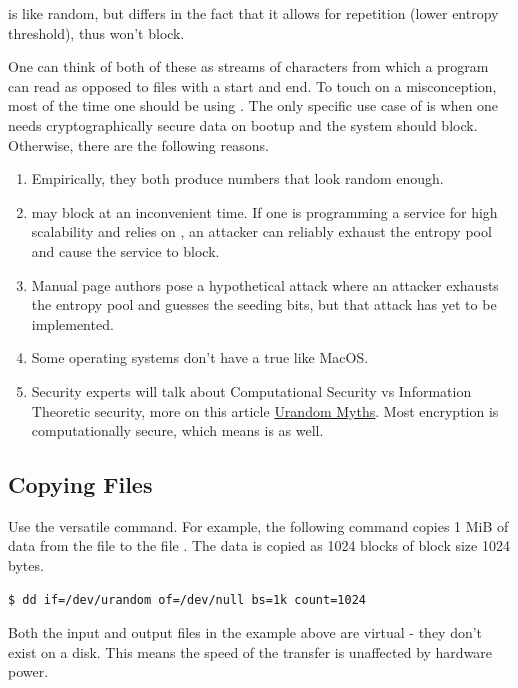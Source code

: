  is like random, but differs in the fact that it allows for repetition (lower entropy threshold), thus won't block.

One can think of both of these as streams of characters from which a program can read as opposed to files with a start and end.
To touch on a misconception, most of the time one should be using .
The only specific use case of  is when one needs cryptographically secure data on bootup and the system should block.
Otherwise, there are the following reasons.

\begin{enumerate}
\item Empirically, they both produce numbers that look random enough.
\item {} may block at an inconvenient time. If one is programming a service for high scalability and relies on , an attacker can reliably exhaust the entropy pool and cause the service to block.
\item Manual page authors pose a hypothetical attack where an attacker exhausts the entropy pool and guesses the seeding bits, but that attack has yet to be implemented.
\item Some operating systems don't have a true  like MacOS.
\item Security experts will talk about Computational Security vs Information Theoretic security, more on this article \href{https://www.2uo.de/myths-about-urandom}{Urandom Myths}. Most encryption is computationally secure, which means  is as well.
\end{enumerate}

\subsection{Copying Files}

Use the versatile  command.
For example, the following command copies 1 MiB of data from the file  to the file .
The data is copied as 1024 blocks of block size 1024 bytes.

\begin{lstlisting}[language=bash]
$ dd if=/dev/urandom of=/dev/null bs=1k count=1024
\end{lstlisting}

Both the input and output files in the example above are virtual - they don't exist on a disk.
This means the speed of the transfer is unaffected by hardware power.

